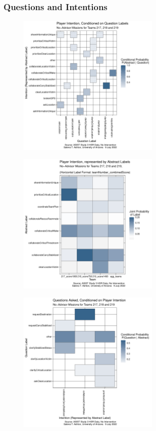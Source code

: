 \documentclass[10pt]{article}
\begin{document}
\subsubsection{Questions and Intentions}
\begin{figure}[h!]
    \centering
    \includegraphics[width=0.6\textwidth]{../figures/abstractLabel_ConditionalProbability_STA.pdf}
    \caption{ }
\end{figure}


\begin{figure}[h!]
    \centering
    \includegraphics[width=0.6\textwidth]{../figures/abstractLabelProbability_STA.pdf}
    \caption{ }
\end{figure}


\begin{figure}[h!]
    \centering
    \includegraphics[width=0.6\textwidth]{../figures/questionLabel_ConditionalProbability_STA.pdf}
    \caption{ }
\end{figure}
\end{document}
